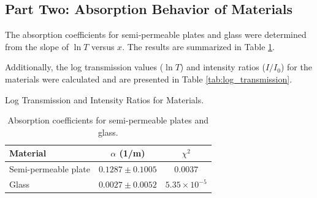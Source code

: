 \documentclass[journal]{IEEEtran}
\begin{document}
\subsection{Part Two: Absorption Behavior of Materials}
The absorption coefficients for semi-permeable plates and glass were determined from the slope of $\ln T$ versus $x$. The results are summarized in Table \ref{tab:attenuation_coefficients}.

Additionally, the log transmission values ($\ln T$) and intensity ratios ($I/I_0$) for the materials were calculated and are presented in Table \ref{tab:log_transmission}.

\begin{table}[H]
    \centering
    \caption{Log Transmission and Intensity Ratios for Materials.}
    \label{tab:log_transmission}
\end{table}



\begin{table}[H]
    \centering
    \caption{Absorption coefficients for semi-permeable plates and glass.}
    \label{tab:attenuation_coefficients}
    \begin{tabular}{@{}lcc@{}}
        \toprule
        Material            & $\alpha$ (1/m) & $\chi^2$ \\ \midrule
        Semi-permeable plate & $0.1287 \pm 0.1005$ & $0.0037$ \\
        Glass               & $0.0027 \pm 0.0052$ & $5.35 \times 10^{-5}$ \\ \bottomrule
    \end{tabular}
\end{table}
\end{document}
